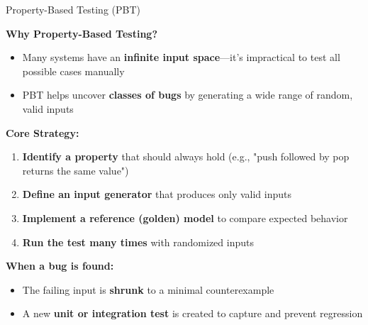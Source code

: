 \begin{frame}{Property-Based Testing (PBT)}
	
	\textbf{Why Property-Based Testing?}
	\begin{itemize}
		\item Many systems have an \textbf{infinite input space}---it's impractical to test all possible cases manually
		\item PBT helps uncover \textbf{classes of bugs} by generating a wide range of random, valid inputs
	\end{itemize}
	\pause
	\vspace{1em}
	\textbf{Core Strategy:}
	\begin{enumerate}
		\item \textbf{Identify a property} that should always hold (e.g., "push followed by pop returns the same value")
		\item \textbf{Define an input generator} that produces only valid inputs
		\item \textbf{Implement a reference (golden) model} to compare expected behavior
		\item \textbf{Run the test many times} with randomized inputs
	\end{enumerate}
	\pause
	\vspace{1em}
	\textbf{When a bug is found:}
	\begin{itemize}
		\item The failing input is \textbf{shrunk} to a minimal counterexample
		\item A new \textbf{unit or integration test} is created to capture and prevent regression
	\end{itemize}
	
\end{frame}

